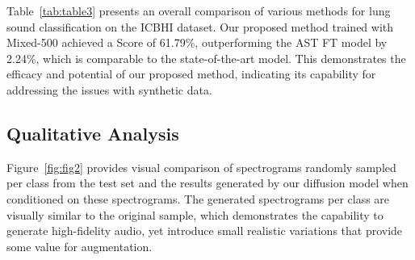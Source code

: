 \documentclass{article}
\begin{document}
\begin{table*}[!t]
    \centering
    \caption{Overall comparison of the ICBHI dataset for the respiratory sound classification task. We compared previous studies that followed the official 60-40\% split for the training/test set. Scores marked with  denote the previous state-of-the-art performance. \textbf{Best} and {\underline{second best}} results.}
    
    \label{tab:table3}
    \renewcommand{\arraystretch}{1}
    \addtolength{\tabcolsep}{3pt}
\end{table*}
 Table~\ref{tab:table3} presents an overall comparison of various methods for lung sound classification on the ICBHI dataset. Our proposed method trained with Mixed-500 achieved a Score of 61.79\%, outperforming the AST FT model by 2.24\%, which is comparable to the state-of-the-art model.
This demonstrates the efficacy and potential of our proposed method, indicating its capability for addressing the issues with synthetic data.


\subsection{Qualitative Analysis}
Figure~\ref{fig:fig2} provides visual comparison of spectrograms randomly sampled per class from the test set and the results generated by our diffusion model when conditioned on these spectrograms. The generated spectrograms per class are visually similar to the original sample, which demonstrates the capability to generate high-fidelity audio, yet introduce small realistic variations that provide some value for augmentation.
\end{document}
